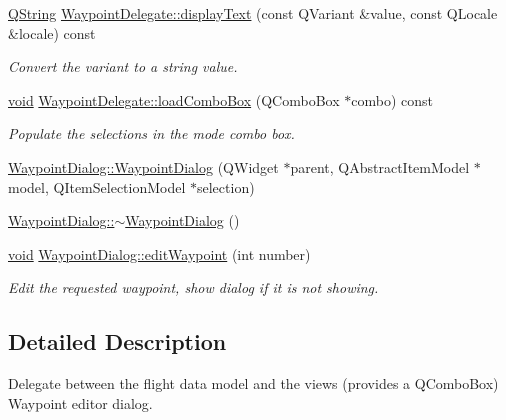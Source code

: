\begin{DoxyCompactItemize}
\hyperlink{group___u_a_v_objects_plugin_gab9d252f49c333c94a72f97ce3105a32d}{\-Q\-String} \hyperlink{group___path_planner_ga14243b35579b422c1343085132072746}{\-Waypoint\-Delegate\-::display\-Text} (const \-Q\-Variant \&value, const \-Q\-Locale \&locale) const 
\begin{DoxyCompactList}\small\item\em \-Convert the variant to a string value. \end{DoxyCompactList}\item 
\hyperlink{group___u_a_v_objects_plugin_ga444cf2ff3f0ecbe028adce838d373f5c}{void} \hyperlink{group___path_planner_ga2ea240fcdff4626ac277f5160f67f2e6}{\-Waypoint\-Delegate\-::load\-Combo\-Box} (\-Q\-Combo\-Box $\ast$combo) const 
\begin{DoxyCompactList}\small\item\em \-Populate the selections in the mode combo box. \end{DoxyCompactList}\item 
\hyperlink{group___path_planner_ga79559741b9fcf0a36768f7df92746760}{\-Waypoint\-Dialog\-::\-Waypoint\-Dialog} (\-Q\-Widget $\ast$parent, \-Q\-Abstract\-Item\-Model $\ast$model, \-Q\-Item\-Selection\-Model $\ast$selection)
\item 
\hyperlink{group___path_planner_ga54d6efacbe7553519262195483f76ed5}{\-Waypoint\-Dialog\-::$\sim$\-Waypoint\-Dialog} ()
\item 
\hyperlink{group___u_a_v_objects_plugin_ga444cf2ff3f0ecbe028adce838d373f5c}{void} \hyperlink{group___path_planner_ga903050cdff8176aeedca31eae8b7ea02}{\-Waypoint\-Dialog\-::edit\-Waypoint} (int number)
\begin{DoxyCompactList}\small\item\em \-Edit the requested waypoint, show dialog if it is not showing. \end{DoxyCompactList}\end{DoxyCompactItemize}


\subsection{\-Detailed \-Description}
\-Delegate between the flight data model and the views (provides a \-Q\-Combo\-Box) \-Waypoint editor dialog. 

